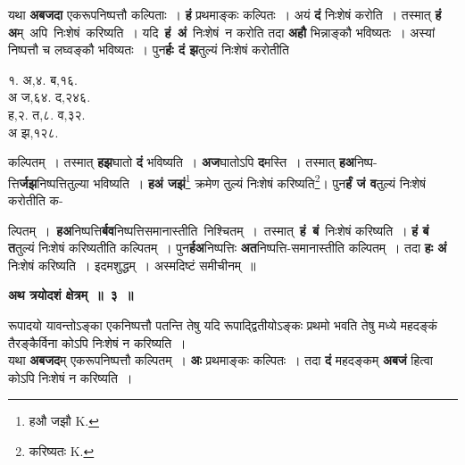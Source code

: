 \documentclass[11pt, openany]{book}
\begin{document}
\begin{flushleft}
\begin{minipage}[t]{0.65\textwidth}
\hspace{4mm}  यथा \textbf{अबजदा} एकरूपनिष्पत्तौ कल्पिताः~। \textbf{हं} प्रथमाङ्कः कल्पितः~।  अयं \textbf{दं} निःशेषं करोति~। तस्मात् \textbf{हं अ}म् \,अपि \,निःशेषं \,करिष्यति~। यदि \,\textbf{हं \,अं} \,निःशेषं \,न करोति तदा \textbf{अहौ} भिन्नाङ्कौ भविष्यतः~। अस्यां  निष्पत्तौ  च लघ्वङ्कौ भविष्यतः~। पुन\textbf{र्हः दं झ}तुल्यं निःशेषं करोतीति
\end{minipage} 
\hfill
\begin{minipage}[t]{0.25\textwidth}
१. अ,४. ब,१६.\\
{\color{white}अ} ज,६४. द,२४६.\\
ह,२. त,८. व,३२.  \\
{\color{white}अ} झ,१२८.
\end{minipage}
\end{flushleft}
\vspace{-3mm}

\noindent कल्पितम्~। तस्मात् \textbf{हझ}घातो \textbf{दं} भविष्यति~। \textbf{अज}घातोऽपि \textbf{द}मस्ति~। तस्मात् \textbf{हअ}निष्प-त्ति\textbf{र्जझ}निष्पत्तितुल्या भविष्यति~। \textbf{हअं जझं}\renewcommand{\thefootnote}{१}\footnote{हऔ जझौ {\en K.}} क्रमेण तुल्यं निःशेषं करिष्यति\renewcommand{\thefootnote}{२}\footnote{करिष्यतः {\en K.}}\;। पुन\textbf{र्हं जं व}तुल्यं निःशेषं करोतीति क- 

\newpage
\noindent ल्पितम्~। \,\textbf{हअ}निष्पत्ति\textbf{र्बव}निष्पत्तिसमानास्तीति \,निश्चितम्~। \,तस्मात् \,\textbf{हं \,बं} \,निःशेषं करिष्यति~। \textbf{हं बं त}तुल्यं निःशेषं करिष्यतीति कल्पितम्~। पुन\textbf{र्हअ}निष्पत्तिः \textbf{अत}निष्पत्ति-समानास्तीति कल्पितम्~। तदा \textbf{हः अं} निःशेषं करिष्यति~। इदमशुद्धम्~। अस्मदिष्टं समीचीनम्~॥ 
\vspace{2mm}

\begin{center}
\textbf{\large  अथ त्रयोदशं क्षेत्रम्~॥~३~॥}
\end{center}

 {\ab रूपादयो यावन्तोऽङ्का एकनिष्पत्तौ पतन्ति तेषु यदि रूपाद्द्वितीयोऽङ्कः प्रथमो भवति तेषु मध्ये महदङ्कं तैरङ्कैर्विना कोऽपि निःशेषं न करिष्यति~।}\\ 

 यथा \textbf{अबजद}म् एकरूपनिष्पत्तौ कल्पितम्~। \textbf{अः} प्रथमाङ्कः कल्पितः~। तदा \textbf{दं} महदङ्कम् \textbf{अबजं} हित्वा कोऽपि निःशेषं न करिष्यति~। 
\end{document}
